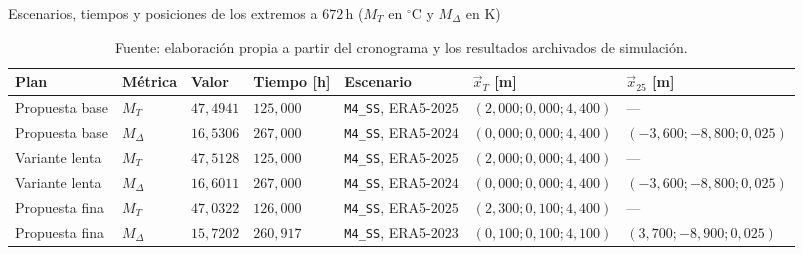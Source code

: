 \begin{table}[htbp]
  \centering
  \caption{Escenarios, tiempos y posiciones de los extremos a $672\,\mathrm h$ ($M_T$ en $^\circ\mathrm C$ y $M_\Delta$ en $\mathrm K$)}
  \label{tab:localizacion-maximos}
  \small
  \setlength{\tabcolsep}{4pt}
  \begin{tabular}{L{1.5cm}L{1.2cm}L{1.15cm}L{1.2cm}L{1.8cm}L{3.3cm}L{3.3cm}}
    \toprule
    Plan & Métrica & Valor & Tiempo [h] & Escenario & $\vec x_T$ [m] & $\vec x_{25}$ [m] \\
    \midrule
    Propuesta base & $M_T$ & $47{,}4941$ & $125{,}000$ & \texttt{M4\_SS}, ERA5-$2025$ & $(2{,}000;0{,}000;4{,}400)$ & --- \\
    Propuesta base & $M_\Delta$ & $16{,}5306$ & $267{,}000$ & \texttt{M4\_SS}, ERA5-$2024$ & $(0{,}000;0{,}000;4{,}400)$ & $(-3{,}600;-8{,}800;0{,}025)$ \\
    Variante lenta & $M_T$ & $47{,}5128$ & $125{,}000$ & \texttt{M4\_SS}, ERA5-$2025$ & $(2{,}000;0{,}000;4{,}400)$ & --- \\
    Variante lenta & $M_\Delta$ & $16{,}6011$ & $267{,}000$ & \texttt{M4\_SS}, ERA5-$2024$ & $(0{,}000;0{,}000;4{,}400)$ & $(-3{,}600;-8{,}800;0{,}025)$ \\
    Propuesta fina & $M_T$ & $47{,}0322$ & $126{,}000$ & \texttt{M4\_SS}, ERA5-$2025$ & $(2{,}300;0{,}100;4{,}400)$ & --- \\
    Propuesta fina & $M_\Delta$ & $15{,}7202$ & $260{,}917$ & \texttt{M4\_SS}, ERA5-$2023$ & $(0{,}100;0{,}100;4{,}100)$ & $(3{,}700;-8{,}900;0{,}025)$ \\
    \bottomrule
  \end{tabular}
  \captionsetup{skip=2pt}
  \caption*{Fuente: elaboración propia a partir del cronograma y los resultados archivados de simulación.}
\end{table}
